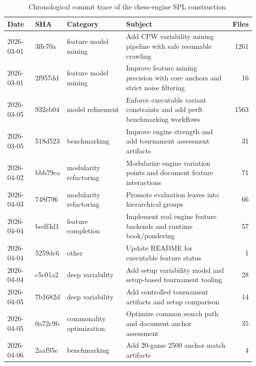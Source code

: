 \begin{table}[t]
\centering
\caption{Chronological commit trace of the chess-engine SPL construction.}
\label{tab:commit-trace}
\small
\begin{tabular}{@{}llllr@{}}
\toprule
\textbf{Date} & \textbf{SHA} & \textbf{Category} & \textbf{Subject} & \textbf{Files} \\
\midrule
2026-03-01 & 3ffe70a & feature model mining & Add CPW variability mining pipeline with safe resumable crawling & 1261 \\
2026-03-01 & 2f957dd & feature model mining & Improve feature mining precision with core anchors and strict noise filtering & 16 \\
2026-03-05 & 932eb04 & model refinement & Enforce executable variant constraints and add perft benchmarking workflows & 1563 \\
2026-03-05 & 518d523 & benchmarking & Improve engine strength and add tournament assessment artifacts & 31 \\
2026-04-02 & bbb79ca & modularity refactoring & Modularize engine variation points and document feature interactions & 71 \\
2026-04-03 & 748f796 & modularity refactoring & Promote evaluation leaves into hierarchical groups & 66 \\
2026-04-04 & bedf3d1 & feature completion & Implement real engine feature backends and runtime book/pondering & 57 \\
2026-04-04 & 5259dc6 & other & Update README for executable feature status & 1 \\
2026-04-04 & c5c01a2 & deep variability & Add setup variability model and setup-based tournament tooling & 28 \\
2026-04-05 & 7b1682d & deep variability & Add controlled tournament artifacts and setup comparison & 14 \\
2026-04-05 & 0a72c9b & commonality optimization & Optimize common search path and document anchor assessment & 35 \\
2026-04-06 & 2aaf95e & benchmarking & Add 20-game 2500 anchor match artifacts & 4 \\
\bottomrule
\end{tabular}
\end{table}
